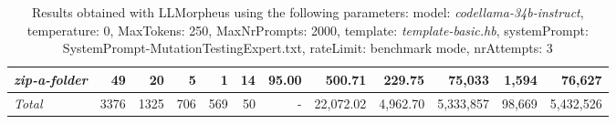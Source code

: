 \begin{table*}
{\begin{tabular}{l||r|r|r|r|r|r||r|r||r|r|r}
   \hline
   \textit{zip-a-folder} & 49 & 20 & 5 & 1 & 14 & 95.00 & 500.71 & 229.75 & 75,033 & 1,594 & 76,627 \\ 
   \hline
   \textit{Total} & 3376 & 1325 & 706 & 569 & 50 & - & 22,072.02  & 4,962.70 & 5,333,857 & 98,669 & 5,432,526 \\ 
 \end{tabular}
 }
 \caption{Results obtained with LLMorpheus using the following parameters: 
   model: \textit{codellama-34b-instruct}, 
   temperature: 0, 
   MaxTokens: 250, 
   MaxNrPrompts: 2000, 
   template: \textit{template-basic.hb}, 
   systemPrompt: SystemPrompt-MutationTestingExpert.txt, 
   rateLimit: benchmark mode, 
   nrAttempts: 3  
 }
\end{table*}

